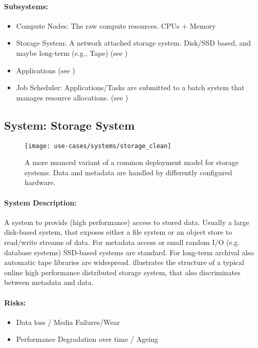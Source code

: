 \paragraph{Subsystems:}


\begin{itemize}
	\item Compute Nodes: The raw compute resources. CPUs + Memory
	\item Storage System: A network attached storage system. Disk/SSD based, and maybe long-term (e.g., Tape) (see )
	\item Applications (see )
	\item Job Scheduler: Applications/Tasks are submitted to a batch system that manages resource allocations. (see )
\end{itemize}



\subsection{System: Storage System}
\label{System: Storage System}

\begin{figure}
	\centering
	\texttt{[image: use-cases/systems/storage\_clean]}
	\caption{A more nuanced variant of a common deployment model for storage systems. Data and metadata are handled by differently configured hardware. }
	\label{fig:System: Storage System}
\end{figure}


\paragraph{System Description:}
A system to provide (high performance) access to stored data.
Usually a large disk-based system, that exposes either a file system or an object store to read/write streams of data.
For metadata access or small random I/O (e.g. database systems) SSD-based systems are standard.
For long-term archival also automatic tape libraries are widespread.
 illustrates the structure of a typical online high performance distributed storage system, that also discriminates between metadata and data.

\paragraph{Risks:}
\begin{itemize}
	\item Data loss / Media Failures/Wear
	\item Performance Degradation over time / Ageing
\end{itemize}


